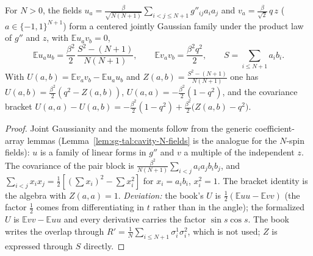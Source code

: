 \begin{lemma}
\label{lem:sg-tal:pair-perturb-fields}
  \leanok
{}
For $N>0$, the fields $u_a=\tfrac{\beta}{\sqrt{N(N+1)}}\sum_{i<j\le N+1}g''_{ij}a_ia_j$ and
$v_a=\tfrac{\beta}{\sqrt2}\,q\,z$ ($a\in\{-1,1\}^{N+1}$) form a centered jointly Gaussian family under the
product law of $g''$ and $z$, with $\mathbb E u_av_b=0$,
\[
 \mathbb E u_au_b=\frac{\beta^2}{2}\,\frac{S^2-(N+1)}{N(N+1)},\qquad
 \mathbb E v_av_b=\frac{\beta^2q^2}{2},\qquad S=\sum_{i\le N+1}a_ib_i .
\]
With $U(a,b)=\mathbb E v_av_b-\mathbb E u_au_b$ and $Z(a,b)=\frac{S^2-(N+1)}{N(N+1)}$ one has
$U(a,b)=\frac{\beta^2}{2}(q^2-Z(a,b))$, $U(a,a)=-\frac{\beta^2}{2}(1-q^2)$, and the covariance bracket
$U(a,a)-U(a,b)=-\frac{\beta^2}{2}(1-q^2)+\frac{\beta^2}{2}\bigl(Z(a,b)-q^2\bigr)$.
\end{lemma}
\begin{proof}
  \leanok
Joint Gaussianity and the moments follow from the generic coefficient-array lemmas
(Lemma~\ref{lem:sg-tal:cavity-N-fields} is the analogue for the $N$-spin fields): $u$ is a family of
linear forms in $g''$ and $v$ a multiple of the independent $z$.  The covariance of the pair block is
$\frac{\beta^2}{N(N+1)}\sum_{i<j}a_ia_jb_ib_j$, and $\sum_{i<j}x_ix_j=\frac12[(\sum x_i)^2-\sum x_i^2]$
for $x_i=a_ib_i$, $x_i^2=1$.  The bracket identity is the algebra with $Z(a,a)=1$.
\emph{Deviation:} the book's $U$ is $\frac12(\mathbb E u u-\mathbb E vv)$ (the factor $\frac12$ comes
from differentiating in $t$ rather than in the angle); the formalized $U$ is $\mathbb E vv-\mathbb E uu$
and every derivative carries the factor $\sin s\cos s$.  The book writes the overlap through
$R'=\frac1N\sum_{i\le N+1}\sigma_i^1\sigma_i^2$, which is not used; $Z$ is expressed through $S$
directly.
\end{proof}

